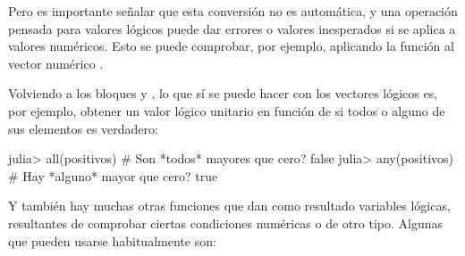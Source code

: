 ﻿\documentclass[spanish]{article}
\begin{document}
Pero es importante señalar que esta conversión no es automática, y una operación
pensada para valores lógicos puede dar errores o valores inesperados si
se aplica a valores numéricos. Esto se puede comprobar, por ejemplo, aplicando la
función  al vector numérico .

Volviendo a los bloques  y , lo que sí se puede hacer con
los vectores lógicos es, por ejemplo, obtener un valor lógico unitario en función
de si todos o alguno de sus elementos es verdadero:

julia> all(positivos) # Son *todos* mayores que cero?
false
julia> any(positivos) # Hay *alguno* mayor que cero?
true

Y también hay muchas otras funciones que dan como resultado variables lógicas,
resultantes de comprobar ciertas condiciones numéricas o de otro tipo.
Algunas que pueden usarse habitualmente son:
\end{document}
